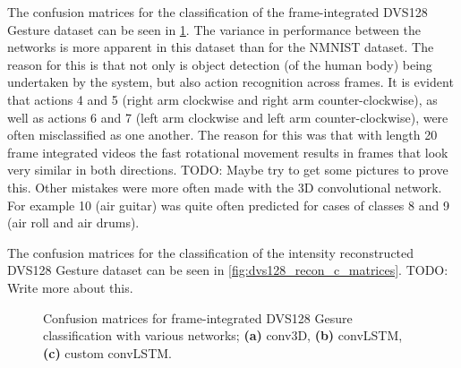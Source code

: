 The confusion matrices for the classification of the frame-integrated DVS128 Gesture dataset can be seen in \cref{fig:dvs128_c_matrices}. The variance in performance between the networks is more apparent in this dataset than for the NMNIST dataset. The reason for this is that not only is object detection (of the human body) being undertaken by the system, but also action recognition across frames. It is evident that actions 4 and 5 (right arm clockwise and right arm counter-clockwise), as well as actions 6 and 7 (left arm clockwise and left arm counter-clockwise), were often misclassified as one another. The reason for this was that with length 20 frame integrated videos the fast rotational movement results in frames that look very similar in both directions. \color{red} TODO: Maybe try to get some pictures to prove this. \color{black} Other mistakes were more often made with the 3D convolutional network. For example 10 (air guitar) was quite often predicted for cases of classes 8 and 9 (air roll and air drums). 

The confusion matrices for the classification of the intensity reconstructed DVS128 Gesture dataset can be seen in \cref{fig:dvs128_recon_c_matrices}. \color{red} TODO: Write more about this. \color{black}

\begin{figure}[htb]%
    \centering
    \qquad
    \qquad
    \caption{Confusion matrices for frame-integrated  DVS128 Gesure classification with various networks; \textbf{(a)} conv3D, \textbf{(b)} convLSTM, \textbf{(c)} custom convLSTM.}%
    \label{fig:dvs128_c_matrices}%
\end{figure}

